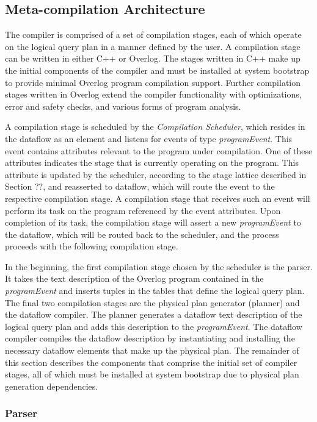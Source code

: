 \documentclass{vldb}
\begin{document}
\subsection{Meta-compilation Architecture}

The compiler is comprised of a set of compilation stages, each of which
operate on the logical query plan in a manner defined by the user.
A compilation stage can be written in either C++ or Overlog. The stages
written in C++ make up the initial components of the compiler and must
be installed at system bootstrap to provide minimal Overlog program
compilation support. Further compilation stages written in Overlog extend
the compiler functionality with optimizations, error and
safety checks, and various forms of program analysis. 

A compilation stage is scheduled by the {\em Compilation Scheduler}, which
resides in the dataflow as an element and listens for events of type 
{\em programEvent}.  This event contains attributes relevant to the program
under compilation. One of these attributes indicates the stage that is currently
operating on the program.  This attribute is updated by the scheduler, according
to the stage lattice described in Section ??, and reasserted to dataflow, which will
route the event to the respective compilation stage.  A compilation stage that
receives such an event will perform its task on the program referenced by
the event attributes. Upon completion of its task, the compilation stage will assert
a new {\em programEvent} to the dataflow, which will be routed back to the
scheduler, and the process proceeds with the following compilation stage.

In the beginning, the first compilation stage chosen by the scheduler is the 
parser.  It takes the text description of the Overlog program contained in the
{\em programEvent} and inserts tuples in the tables that define the logical
query plan.  The final two compilation stages are the physical plan generator (planner) 
and the dataflow compiler.  The planner generates a dataflow text description of the
logical query plan and adds this description to the {\em programEvent}. 
The dataflow compiler compiles the dataflow description by instantiating and
installing the necessary dataflow elements that make up the physical plan.
The remainder of this section describes the components that comprise the initial set of 
compiler stages, all of which must be installed at system bootstrap due to physical
plan generation dependencies.

\subsubsection{Parser}
\end{document}
